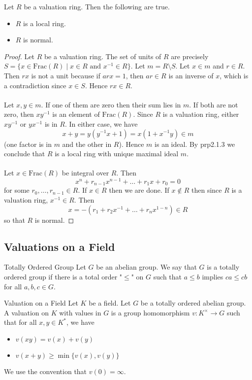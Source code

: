 \documentclass[a4paper]{article}
\begin{document}
\begin{lmm}{}{} Let $R$ be a valuation ring. Then the following are true. 
\begin{itemize}
\item $R$ is a local ring. 
\item $R$ is normal. 
\end{itemize} \tcbline
\begin{proof}
Let $R$ be a valuation ring. The set of units of $R$ are precisely $S=\{x\in\text{Frac}(R)\;|\;x\in R\text{ and }x^{-1}\in R\}$. Let $m=R\setminus S$. Let $x\in m$ and $r\in R$. Then $rx$ is not a unit because if $arx=1$, then $ar\in R$ is an inverse of $x$, which is a contradiction since $x\in S$. Hence $rx\in R$. \\~\\

Let $x,y\in m$. If one of them are zero then their sum lies in $m$. If both are not zero, then $xy^{-1}$ is an element of $\text{Frac}(R)$. Since $R$ is a valuation ring, either $xy^{-1}$ or $yx^{-1}$ is in $R$. In either case, we have $$x+y=y(y^{-1}x+1)=x(1+x^{-1}y)\in m$$ (one factor is in $m$ and the other in $R$). Hence $m$ is an ideal. By prp2.1.3 we conclude that $R$ is a local ring with unique maximal ideal $m$. \\~\\

Let $x\in\text{Frac}(R)$ be integral over $R$. Then $$x^n+r_{n-1}x^{n-1}+\dots+r_1x+r_0=0$$ for some $r_0,\dots,r_{n-1}\in R$. If $x\in R$ then we are done. If $x\notin R$ then since $R$ is a valuation ring, $x^{-1}\in R$. Then $$x=-(r_1+r_2x^{-1}+\dots+r_nx^{1-n})\in R$$ so that $R$ is normal. 
\end{proof}
\end{lmm}

\subsection{Valuations on a Field}
\begin{defn}{Totally Ordered Group}{} Let $G$ be an abelian group. We say that $G$ is a totally ordered group if there is a total order "$\leq$" on $G$ such that $a\leq b$ implies $ca\leq cb$ for all $a,b,c\in G$. 
\end{defn}

\begin{defn}{Valuation on a Field}{} Let $K$ be a field. Let $G$ be a totally ordered abelian group. A valuation on $K$ with values in $G$ is a group homomorphism $v:K^\times\to G$ such that for all $x,y\in K^\ast$, we have 
\begin{itemize}
\item $v(xy)=v(x)+v(y)$
\item $v(x+y)\geq\min\{v(x),v(y)\}$
\end{itemize}
We use the convention that $v(0)=\infty$. 
\end{defn}
\end{document}
